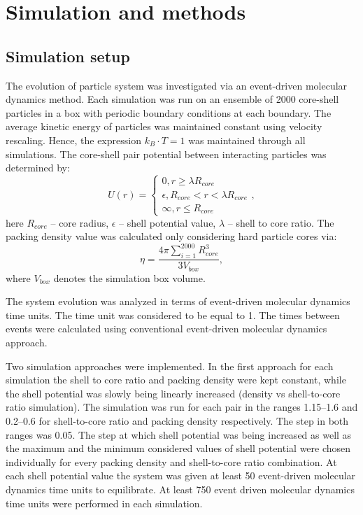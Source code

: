 \section{Simulation and methods}
\subsection{Simulation setup}

The evolution of particle system was investigated via an event-driven molecular dynamics method. Each simulation was run on an ensemble of 2000 core-shell particles in a box with periodic boundary conditions at each boundary. The average kinetic energy of particles was maintained constant using velocity rescaling. Hence, the expression $k_B\cdot T=1$ was maintained through all simulations.
The core-shell pair potential between interacting particles was determined by:
\begin{equation}
U(r)=\begin{cases} 0, r \geq \lambda R_{core} \\ \epsilon, R_{core}<r<\lambda R_{core} \\ \infty, r\leq R_{core} \end{cases},
\end{equation}
here $R_{core}$ -- core radius, $\epsilon$ -- shell potential value, $\lambda$ -- shell to core ratio. 
The packing density value was calculated only considering hard particle cores via:
\begin{equation}
\eta =\frac{4\pi\sum\limits_{i=1}^{2000}R_{core}^3}{3V_{box}},
\end{equation}
where $V_{box}$ denotes the simulation box volume.

The system evolution was analyzed in terms of event-driven molecular dynamics time units. The time unit was considered to be equal to 1. The times between events were calculated using conventional event-driven molecular dynamics approach.\cite{edmd} 

Two simulation approaches were implemented. In the first approach for each simulation the shell to core ratio and packing density were kept constant, while the shell potential was slowly being linearly increased (density vs shell-to-core ratio simulation). The simulation was run for each pair in the ranges 1.15--1.6 and 0.2--0.6 for shell-to-core ratio and packing density respectively. The step in both ranges was 0.05. The step at which shell potential was being increased as well as the maximum and the minimum considered values of shell potential were chosen individually for every packing density and shell-to-core ratio combination. 
At each shell potential value the system was given at least 50 event-driven molecular dynamics time units to equilibrate.  At least 750 event driven molecular dynamics time units were performed in each simulation. 

